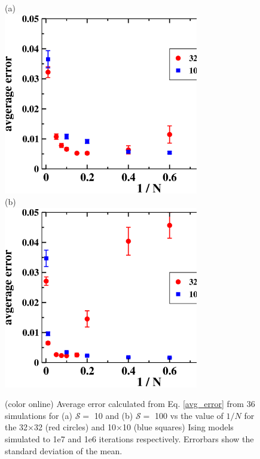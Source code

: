 \documentclass[aps,pre,reprint,superscriptaddress,showkeys]{revtex4-1}
\begin{document}
\begin{figure}[h!]
(a)\\
\includegraphics[width=8.5cm]{fig2a.eps}\\
(b)\\
\includegraphics[width=8.5cm]{fig2b.eps}\\

\caption{(color online) Average error calculated from Eq. \ref{avg_error} from 36 simulations for (a) $\mathcal{S}=$ 10 and (b) $\mathcal{S}=$ 100   vs the value of $1/N$ for the 32$\times$32 (red circles) and 10$\times$10 (blue squares) Ising models simulated to 1e7 and 1e6 iterations respectively.  Errorbars show the standard deviation of the mean. \label{N_dependence}}
\end{figure}
\end{document}
